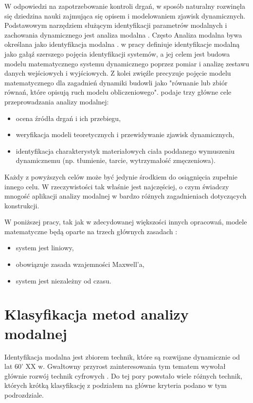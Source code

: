W odpowiedzi na zapotrzebowanie kontroli drgań, w sposób naturalny rozwinęła się dziedzina nauki zajmująca się opisem i modelowaniem zjawisk dynamicznych. Podstawowym narzędziem służącym identyfikacji parametrów modalnych i zachowania dynamicznego jest analiza modalna . Często Analiza modalna bywa określana jako identyfikacja modalna . \parencite{Zhang2004} w pracy definiuje identyfikacje modalną jako gałąź szerszego pojęcia identyfikacji systemów, a jej celem jest budowa modelu matematycznego systemu dynamicznego poprzez pomiar i analizę zestawu danych wejściowych i wyjściowych. Z kolei \cite{Chmielewski1998} zwięźle precyzuje pojęcie modelu matematycznego dla zagadnień dynamiki budowli jako "równanie lub zbiór równań, które opisują ruch modelu obliczeniowego". \cite{Ewins2000} podaje trzy główne cele przeprowadzania analizy modalnej:
\begin{itemize}[noitemsep]
	\item ocena źródła drgań i ich przebiegu,
	\item weryfikacja modeli teoretycznych i przewidywanie zjawisk dynamicznych,
	\item identyfikacja charakterystyk materiałowych ciała poddanego wymuszeniu dynamicznemu (np. tłumienie, tarcie, wytrzymałość zmęczeniowa). 
\end{itemize}
Każdy z powyższych celów może być jedynie środkiem do osiągnięcia zupełnie innego celu. W rzeczywistości tak właśnie jest najczęściej, o czym świadczy mnogość aplikacji analizy modalnej w bardzo różnych zagadnieniach dotyczących konstrukcji.

W poniższej pracy, tak jak w zdecydowanej większości innych opracowań, modele matematyczne będą oparte na trzech głównych zasadach \parencite{Maia1997}:
\begin{itemize}[noitemsep]
	\item system jest liniowy,
	\item obowiązuje zasada wzajemności Maxwell'a,
	\item system jest niezależny od czasu.
\end{itemize}


\section{Klasyfikacja metod analizy modalnej}

Identyfikacja modalna jest zbiorem technik, które są rozwijane dynamicznie od lat 60' XX w. Gwałtowny przyrost zainteresowania tym tematem wywołał głównie rozwój technik cyfrowych \parencite{Ewins2000}. Do tej pory powstało wiele różnych technik, których krótką klasyfikację z podziałem na główne kryteria podano w tym podrozdziale.

